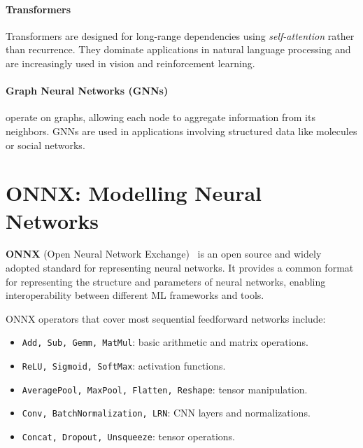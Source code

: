 \documentclass[oneside,11pt,dvipsnames]{book}
\numberwithin{equation}{section}
\theoremstyle{definition}
\theoremstyle{remark}
\begin{document}
\paragraph{Transformers} Transformers are designed for long-range dependencies using \emph{self-attention} rather than recurrence. They dominate applications in natural language processing and are increasingly used in vision and reinforcement learning.

\paragraph{Graph Neural Networks (GNNs)} operate on graphs, allowing each node to aggregate information from its neighbors. GNNs are used in applications involving structured data like molecules or social networks.



\section{ONNX: Modelling Neural Networks}\label{sec:onnx}

\textbf{ONNX} (Open Neural Network Exchange)~\cite{onnx} is an open source and widely adopted standard for representing neural networks. It provides a common format for representing the structure and parameters of neural networks, enabling interoperability between different ML frameworks and tools.



ONNX operators that cover most sequential feedforward networks include: 
\begin{itemize}
    \item \texttt{Add, Sub, Gemm, MatMul}: basic arithmetic and matrix operations.
    \item \texttt{ReLU, Sigmoid, SoftMax}: activation functions.
    \item \texttt{AveragePool, MaxPool, Flatten, Reshape}: tensor manipulation.
    \item \texttt{Conv, BatchNormalization, LRN}: CNN layers and normalizations.
    \item \texttt{Concat, Dropout, Unsqueeze}: tensor operations.
\end{itemize}
\end{document}

